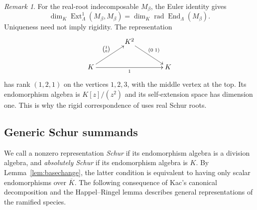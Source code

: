 \documentclass[11pt, reqno]{amsart}
\numberwithin{equation}{section}
\theoremstyle{definition}
\theoremstyle{remark}
\newtheorem{remark}[theorem]{Remark}
\newcommand{\op}[1]{\operatorname{#1}}
\newcommand{\End}{\op{End}}
\newcommand{\Ext}{\op{Ext}}
\newcommand{\rad}{\op{rad}}
\newcommand{\Kbar}{\overline K}
\newcommand{\quiverdiagram}[1]{\vcenter{\hbox{$\displaystyle #1$}}}
\begin{document}
\begin{remark}\label{rem:rigidity}
For the real-root indecomposable $M_\beta$, the Euler identity gives
\[ \dim_K\Ext^1_\Lambda(M_\beta,M_\beta)=\dim_K\rad\End_\Lambda(M_\beta). \]
Uniqueness need not imply rigidity. The representation
\[
\quiverdiagram{\xymatrix@C=3.8em@R=2.3em{
 &K^2\ar[dr]^{(0\;1)}&\\
 K\ar[ur]^{\binom10}\ar[rr]_{1}&&K
}}
\]
has rank $(1,2,1)$ on the vertices $1,2,3$, with the middle vertex
at the top. Its endomorphism algebra is $K[z]/(z^2)$ and its
self-extension space has dimension one. This is why
the rigid correspondence of \cite{GLSrigid} uses real Schur roots.
\end{remark}


\subsection{Generic Schur summands}
We call a nonzero representation \emph{Schur} if its endomorphism
algebra is a division algebra, and \emph{absolutely Schur} if its
endomorphism algebra is $K$. By Lemma~\ref{lem:basechange}, the latter
condition is equivalent to having only scalar endomorphisms over
$\Kbar$. The following consequence of Kac's canonical decomposition
and the Happel--Ringel lemma describes general representations of
the ramified species.
\end{document}
